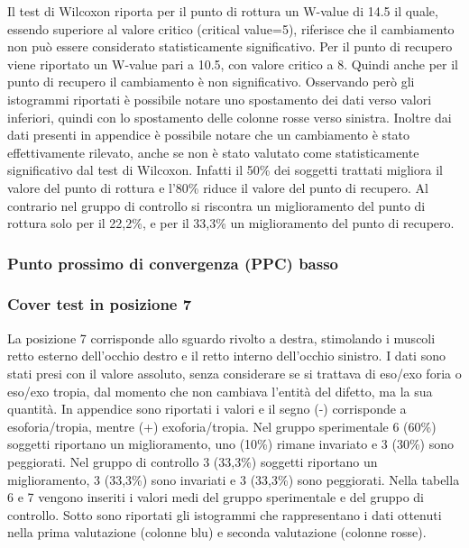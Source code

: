 Il test di Wilcoxon riporta per il punto di rottura un W-value di 14.5 il quale, essendo superiore al valore critico (critical value=5), riferisce che il cambiamento non può essere considerato statisticamente significativo. Per il punto di recupero viene riportato un W-value pari a 10.5, con valore critico a 8. Quindi anche per il punto di recupero il cambiamento è non significativo. Osservando però gli istogrammi riportati è possibile notare uno spostamento dei dati verso valori inferiori, quindi con lo spostamento delle colonne rosse verso sinistra. Inoltre dai dati presenti in appendice è possibile notare che un cambiamento è stato effettivamente rilevato, anche se non è stato valutato come statisticamente significativo dal test di Wilcoxon. Infatti il 50\% dei soggetti trattati migliora il valore del punto di rottura e l’80\% riduce il valore del punto di recupero. Al contrario nel gruppo di controllo si riscontra un miglioramento del punto di rottura solo per il 22,2\%, e per il 33,3\% un miglioramento del punto di recupero.

\subsubsection{Punto prossimo di convergenza (PPC) basso}




\subsubsection{Cover test in posizione 7}

La posizione 7 corrisponde allo sguardo rivolto a destra, stimolando i muscoli retto esterno dell’occhio destro e il retto interno dell’occhio sinistro. I dati sono stati presi con il valore assoluto, senza considerare se si trattava di eso/exo foria o eso/exo tropia, dal momento che non cambiava l’entità del difetto, ma la sua quantità. In appendice sono riportati i valori e il segno (-) corrisponde a esoforia/tropia, mentre (+) exoforia/tropia. Nel gruppo sperimentale 6 (60\%) soggetti riportano un miglioramento, uno (10\%) rimane invariato e 3 (30\%) sono peggiorati. Nel gruppo di controllo 3 (33,3\%) soggetti riportano un miglioramento, 3 (33,3\%) sono invariati e 3 (33,3\%) sono peggiorati. Nella tabella 6 e 7 vengono inseriti i valori medi del gruppo sperimentale e del gruppo di controllo. Sotto sono riportati gli istogrammi che rappresentano i dati ottenuti nella prima valutazione (colonne blu) e seconda valutazione (colonne rosse).

